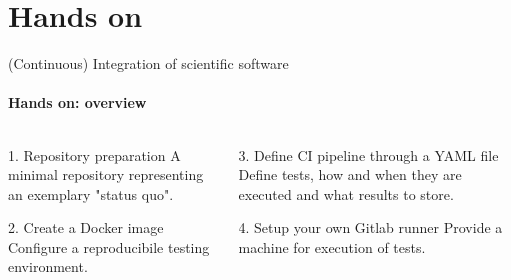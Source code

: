 \section{Hands on}

\begin{frame}{(Continuous) Integration of scientific software}
    \framesubtitle{Hands on: overview}
    \begin{columns}
    \begin{column}{0.48\textwidth}
        \begin{exampleblock}{1. Repository preparation}
            A minimal repository representing an exemplary
            "status quo".
        \end{exampleblock}
        \begin{block}{2. Create a Docker image}
            Configure a reproducibile testing environment.
        \end{block}
    \end{column}

    \begin{column}{0.48\textwidth}
        \begin{block}{3. Define CI pipeline through a YAML file}
            Define tests, how and when they are executed and what
            results to store.
        \end{block}
        \begin{block}{4. Setup your own Gitlab runner}
            Provide a machine for execution of tests.
        \end{block}
    \end{column}
    \end{columns}
\end{frame}
